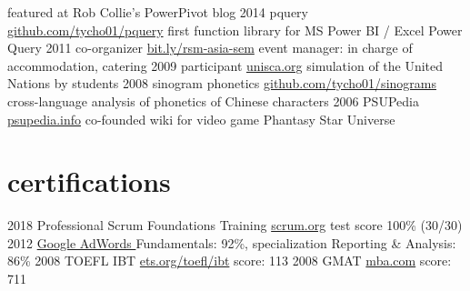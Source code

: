 \documentclass[]{friggeri-cv}
\begin{document}
\begin{entrylist}
    {
      featured at
      Rob Collie's PowerPivot blog
    }
  \entry
    {2014}
    {pquery}
    {\href{https://github.com/KiaraGrouwstra/pquery}{github.com/tycho01/pquery}}
    {
      first function library for
      MS Power BI / Excel Power Query
    }
  \entry
    {2011}
    {%
co-organizer
    }
    {\href{https://www.facebook.com/Doing-Business-in-Asia-Seminar-310520148998549/}{bit.ly/rsm-asia-sem}}
    {
      event manager:
      in charge of accommodation, catering
    }
  \entry
    {2009}
    {%
participant
    }
    {\href{http://unisca.org/}{unisca.org}}
    {
      simulation of the United Nations by students
    }
  \entry
    {2008}
    {%
sinogram phonetics
    }
    {\href{https://github.com/KiaraGrouwstra/sinograms}{github.com/tycho01/sinograms}}
    {
      cross-language analysis of phonetics of Chinese characters
    }
  \entry
    {2006}
    {PSUPedia}
    {\href{http://psupedia.info/}{psupedia.info}}
    {
      co-founded wiki for video game
      Phantasy Star Universe
    }
\end{entrylist}

\section{certifications}

\begin{entrylist}
  \entry
    {2018}
    {Professional Scrum Foundations Training}
    {\href{https://www.scrum.org/courses/professional-scrum-foundations-training}{scrum.org}}
    {test score 100\% (30/30)}
  \entry
    {2012}
    {\href{https://support.google.com/partners/answer/3154326}{Google AdWords }}
    {}
    {Fundamentals: 92\%,
    specialization
    Reporting \& Analysis: 86\%}
  \entry
    {2008}
    {TOEFL IBT}
    {\href{https://www.ets.org/toefl/ibt}{ets.org/toefl/ibt}}
    {score: 113}
  \entry
    {2008}
    {GMAT}
    {\href{https://www.mba.com/}{mba.com}}
    {score: 711}
\end{entrylist}
\end{document}
